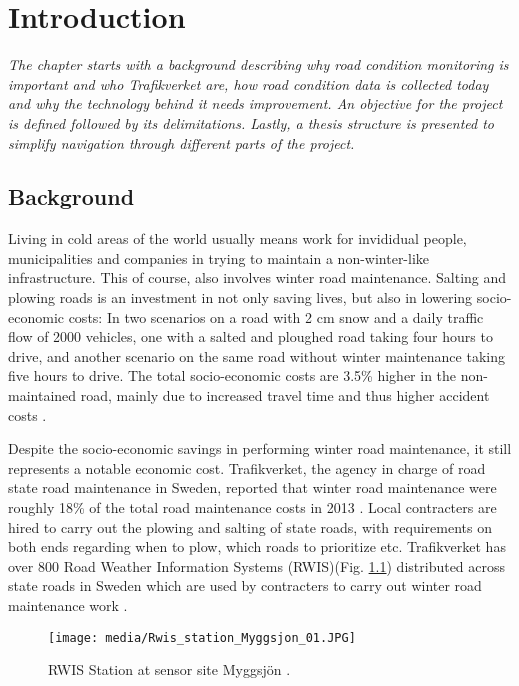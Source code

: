 \chapter{Introduction}
\emph{The chapter starts with a background describing why road condition monitoring is important and who Trafikverket are, how road condition data is collected today and why the technology behind it needs improvement. An objective for the project is defined followed by its delimitations. Lastly, a thesis structure is presented to simplify navigation through different parts of the project.}

\section{Background} \label{sec:background}
	Living in cold areas of the world usually means work for invididual people, municipalities and companies in trying to maintain a non-winter-like infrastructure. This of course, also involves winter road maintenance. Salting and plowing roads is an investment in not only saving lives, but also in lowering socio-economic costs: In two scenarios on a road with 2 cm snow and a daily traffic flow of 2000 vehicles, one with a salted and ploughed road taking four hours to drive, and another scenario on the same road without winter maintenance taking five hours to drive. The total socio-economic costs are 3.5\% higher in the non-maintained road, mainly due to increased travel time and thus higher accident costs \cite{ARTICLE:1}. 

	Despite the socio-economic savings in performing winter road maintenance, it still represents a notable economic cost. Trafikverket, the agency in charge of road state road maintenance in Sweden, reported that winter road maintenance were roughly 18\% of the total road maintenance costs in 2013 \cite{REPORT:1}. Local contracters are hired to carry out the plowing and salting of state roads, with requirements on both ends regarding when to plow, which roads to prioritize etc. Trafikverket has over 800 Road Weather Information Systems (RWIS)(Fig. \ref{img:rwis}) distributed across state roads in Sweden which are used by contracters to carry out winter road maintenance work \cite{WEBSITE:2}. 
\begin{figure}[H]
	\centering
	\texttt{[image: media/Rwis\_station\_Myggsjon\_01.JPG]}
	\caption{RWIS Station at sensor site Myggsjön \cite{IMAGE:1}.}
	\label{img:rwis}
\end{figure}

